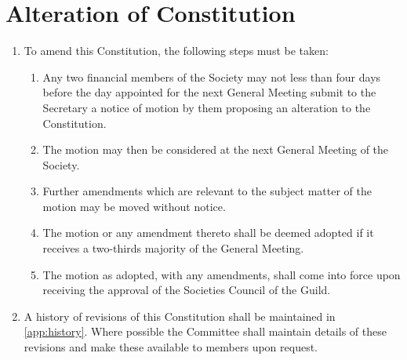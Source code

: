 \documentclass[a4paper]{article}
\begin{document}
\section{Alteration of Constitution}
\begin{enumerate}
    \item To amend this Constitution, the following steps must be taken:
    \begin{enumerate}
        \item Any two financial members of the Society may not less than four days before the day appointed for the next General Meeting submit to the Secretary a notice of motion by them proposing an alteration to the Constitution.
        \item The motion may then be considered at the next General Meeting of the Society.
        \item Further amendments which are relevant to the subject matter of the motion may be moved without notice.
        \item The motion or any amendment thereto shall be deemed adopted if it receives a two-thirds majority of the General Meeting.
        \item The motion as adopted, with any amendments, shall come into force upon receiving the approval of the Societies Council of the Guild.
    \end{enumerate}
    \item A history of revisions of this Constitution shall be maintained in \cref{app:history}. Where possible the Committee shall maintain details of these revisions and make these available to members upon request.
\end{enumerate}
\end{document}
